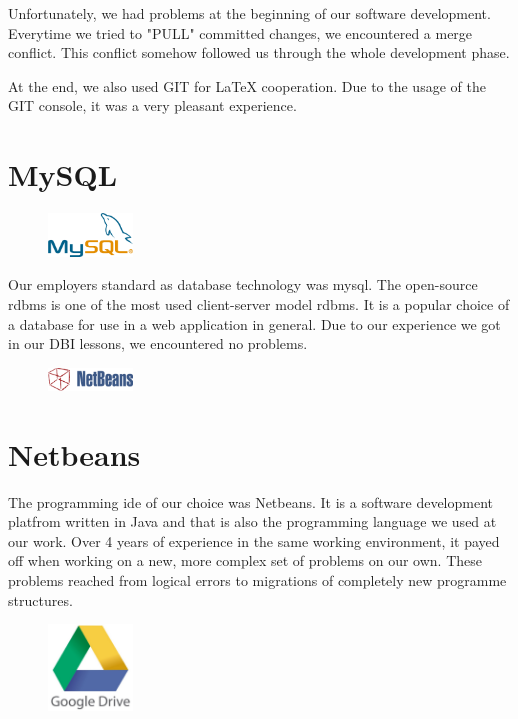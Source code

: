 Unfortunately, we had problems at the beginning of our software development. Everytime we tried to "PULL" committed changes, we encountered a merge conflict. This conflict somehow followed us through the whole development phase.

At the end, we also used GIT for LaTeX cooperation. Due to the usage of the GIT console, it was a very pleasant experience.

\section{MySQL}
\begin{figure}
  \begin{center}
    \includegraphics[width=0.2\textwidth] {bilder/MySQL}
  \end{center}
\end{figure}
Our employers standard as database technology was \gls{mysql}. The open-source \gls{rdbms} is one of the most used client-server model \gls{rdbms}. It is a popular choice of a database for use in a web application in general. Due to our experience we got in our DBI lessons, we encountered no problems.

\begin{figure}
  \begin{center}
    \includegraphics[width=0.2\textwidth] {bilder/NetBeans}
  \end{center}
\end{figure}
\section{Netbeans}
The programming \gls{ide} of our choice was Netbeans. It is a software development platfrom written in Java and that is also the programming language we used at our work. Over 4 years of experience in the same working environment, it payed off when working on a new, more complex set of problems on our own. These problems reached from logical errors to migrations of completely new programme structures. 

\begin{figure}
  \begin{center}
    \includegraphics[width=0.2\textwidth] {bilder/googledrive}
  \end{center}
\end{figure}
